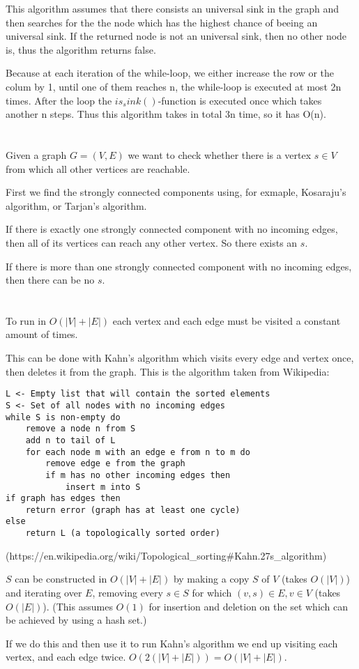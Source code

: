 \documentclass[12pt]{article}
\begin{document}
This algorithm assumes that there consists an universal sink in the graph and then searches for the the node which has the highest chance of beeing an universal sink.
If the returned node is not an universal sink, then no other node is, thus the algorithm returns false.

Because at each iteration of the while-loop, we either increase the row or the colum by 1, until one of them reaches n, the while-loop is executed at most 2n times. 
After the loop the $is_sink()$-function is executed once which takes another n steps.
Thus this algorithm takes in total 3n time, so it has O(n).

\section{} %
Given a graph $G = (V, E)$ we want to check whether there is a vertex $s \in V$ from which all other vertices are reachable.

First we find the strongly connected components using, for exmaple, Kosaraju's algorithm, or Tarjan's algorithm.

If there is exactly one strongly connected component with no incoming edges, then all of its vertices can reach any other vertex. So there exists an $s$.

If there is more than one strongly connected component with no incoming edges, then there can be no $s$.

\section{} %
To run in $O(|V| + |E|)$ each vertex and each edge must be visited a constant amount of times.

This can be done with Kahn's algorithm which visits every edge and vertex once, then deletes it from the graph. This is the algorithm taken from Wikipedia:

\begin{lstlisting}
L <- Empty list that will contain the sorted elements
S <- Set of all nodes with no incoming edges
while S is non-empty do
    remove a node n from S
    add n to tail of L
    for each node m with an edge e from n to m do
        remove edge e from the graph
        if m has no other incoming edges then
            insert m into S
if graph has edges then
    return error (graph has at least one cycle)
else
    return L (a topologically sorted order)
\end{lstlisting}
(https://en.wikipedia.org/wiki/Topological\_sorting\#Kahn.27s\_algorithm)

$S$ can be constructed in $O(|V| + |E|)$ by making a copy $S$ of $V$ (takes $O(|V|)$) and iterating over $E$, removing every $s \in S$ for which $(v, s) \in E, v\in V$ (takes $O(|E|)$). (This assumes $O(1)$ for insertion and deletion on the set which can be achieved by using a hash set.)

If we do this and then use it to run Kahn's algorithm we end up visiting each vertex, and each edge twice. $O(2(|V| + |E|)) = O(|V| + |E|)$.
\end{document}
